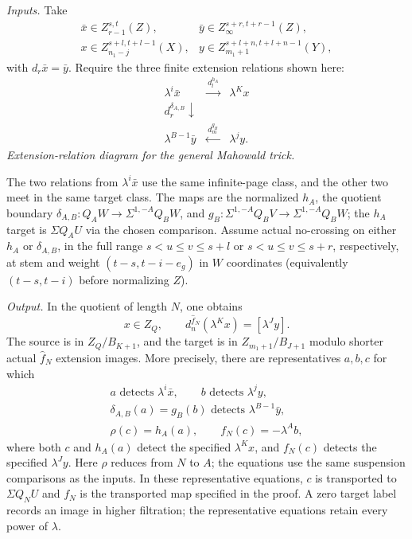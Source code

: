 \begin{theorem}
\textit{Inputs.} Take
\[
\begin{array}{ll}
\bar x\in Z_{r-1}^{s,t}(Z),&\bar y\in Z_\infty^{s+r,t+r-1}(Z),\\
x\in Z_{n_1-j}^{s+l,t+l-1}(X),&
y\in Z_{m_1+1}^{s+l+n,t+l+n-1}(Y),
\end{array}
\]
with $d_r\bar x=\bar y$. Require the three finite extension relations
shown here:
\[
\begin{array}{ccc}
\lambda^i\bar x&\xrightarrow{\ d_l^{h_A}\ }&\lambda^Kx\\
{\scriptstyle d_r^{\delta_{A,B}}}\downarrow&&\\
\lambda^{B-1}\bar y&\xleftarrow{\ d_m^{g_B}\ }&\lambda^jy.
\end{array}
\]
\textit{Extension-relation diagram for the general Mahowald trick.}

The two relations from $\lambda^i\bar x$ use the same infinite-page
class, and the other two meet in the same target class.
The maps are the normalized $h_A$, the quotient boundary
$\delta_{A,B}:Q_AW\to\Sigma^{1,-A}Q_BW$, and
$g_B:\Sigma^{1,-A}Q_BV\to\Sigma^{1,-A}Q_BW$;
the $h_A$ target is $\Sigma Q_AU$ via the chosen comparison.
Assume actual no-crossing on either $h_A$ or $\delta_{A,B}$, in the
full range $s<u\le v\le s+l$ or $s<u\le v\le s+r$, respectively,
at stem and weight $(t-s,t-i-e_g)$ in $W$ coordinates
(equivalently $(t-s,t-i)$ before normalizing $Z$).

\textit{Output.} In the quotient of length $N$, one obtains
\[
\boxed{x\in Z_Q,\qquad
 d_n^{\hat f_N}(\lambda^Kx)=[\lambda^Jy].}
\]
The source is in $Z_Q/B_{K+1}$, and the target is in
$Z_{m_1+1}/B_{J+1}$ modulo shorter actual $\hat f_N$ extension images.
More precisely, there are representatives $a,b,c$ for which
\[
\begin{gathered}
a\text{ detects }\lambda^i\bar x,\qquad b\text{ detects }\lambda^jy,\\
\delta_{A,B}(a)=g_B(b)\text{ detects }\lambda^{B-1}\bar y,\\
\rho(c)=h_A(a),\qquad f_N(c)=-\lambda^Ab,
\end{gathered}
\]
where both $c$ and $h_A(a)$ detect the specified $\lambda^Kx$,
and $f_N(c)$ detects the specified $\lambda^Jy$.
Here $\rho$ reduces from $N$ to $A$; the equations use the same
suspension comparisons as the inputs. In these representative equations,
$c$ is transported to $\Sigma Q_NU$ and $f_N$ is the transported map
specified in the proof. A zero target label records an image in higher filtration;
the representative equations retain every power of $\lambda$.


\end{theorem}
